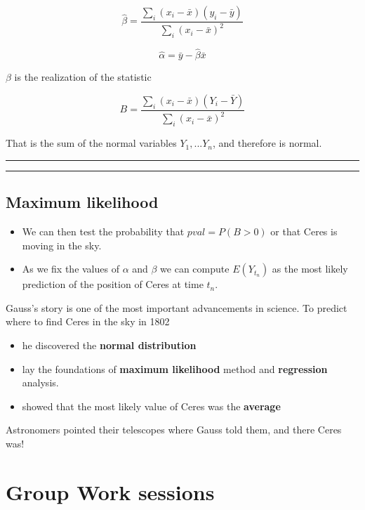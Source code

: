 \documentclass[
]{book}
\providecommand{\tightlist}{%
  \setlength{\itemsep}{0pt}\setlength{\parskip}{0pt}}
\begin{document}
\[\hat{\beta}=\frac{\sum_i (x_i-\bar{x})(y_i -\bar{y})}{\sum_i (x_i-\bar{x})^2}\]

\[\hat{\alpha} = \bar{y} - \hat{\beta} \bar{x}\]

\(\beta\) is the realization of the statistic

\[B=\frac{\sum_i (x_i-\bar{x})(Y_i -\bar{Y})}{\sum_i (x_i-\bar{x})^2}\]

That is the sum of the normal variables \(Y_1, ... Y_n\), and therefore is normal.

\begin{center}\rule{0.5\linewidth}{0.5pt}\end{center}

\begin{center}\rule{0.5\linewidth}{0.5pt}\end{center}

\hypertarget{maximum-likelihood-6}{%
\section{Maximum likelihood}\label{maximum-likelihood-6}}

\begin{itemize}
\item
  We can then test the probability that \(pval=P(B>0)\) or that Ceres is moving in the sky.
\item
  As we fix the values of \(\alpha\) and \(\beta\) we can compute \(E(Y_{t_n})\) as the most likely prediction of the position of Ceres at time \(t_n\).
\end{itemize}

Gauss's story is one of the most important advancements in science. To predict where to find Ceres in the sky in 1802

\begin{itemize}
\tightlist
\item
  he discovered the \textbf{normal distribution}
\item
  lay the foundations of \textbf{maximum likelihood} method and \textbf{regression} analysis.
\item
  showed that the most likely value of Ceres was the \textbf{average}
\end{itemize}

Astronomers pointed their telescopes where Gauss told them, and there Ceres was!

\hypertarget{group-work-sessions}{%
\chapter{Group Work sessions}\label{group-work-sessions}}
\end{document}
